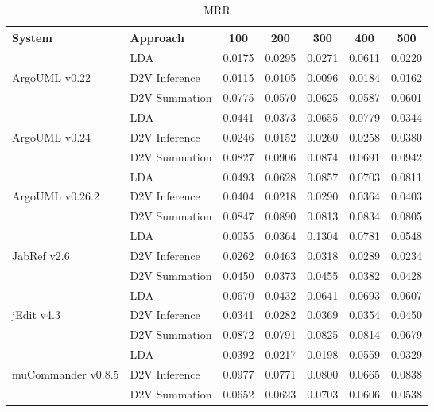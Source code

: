 \begin{table*}
    \centering
\begin{tabular}{llccccc}
\toprule
System & Approach &     100 &    200 &    300 &    400 &    500 \\
\midrule
                   &             LDA & 0.0175 & 0.0295 & 0.0271 & 0.0611 & 0.0220 \\
ArgoUML v0.22      & D2V Inference   & 0.0115 & 0.0105 & 0.0096 & 0.0184 & 0.0162 \\
                   & D2V Summation   & 0.0775 & 0.0570 & 0.0625 & 0.0587 & 0.0601 \\
                     \midrule
                   &             LDA & 0.0441 & 0.0373 & 0.0655 & 0.0779 & 0.0344 \\
ArgoUML v0.24      & D2V Inference   & 0.0246 & 0.0152 & 0.0260 & 0.0258 & 0.0380 \\
                   & D2V Summation   & 0.0827 & 0.0906 & 0.0874 & 0.0691 & 0.0942 \\
                     \midrule
                   &             LDA & 0.0493 & 0.0628 & 0.0857 & 0.0703 & 0.0811 \\
ArgoUML v0.26.2    & D2V Inference   & 0.0404 & 0.0218 & 0.0290 & 0.0364 & 0.0403 \\
                   & D2V Summation   & 0.0847 & 0.0890 & 0.0813 & 0.0834 & 0.0805 \\
                     \midrule
                   &             LDA & 0.0055 & 0.0364 & 0.1304 & 0.0781 & 0.0548 \\
JabRef v2.6        & D2V Inference   & 0.0262 & 0.0463 & 0.0318 & 0.0289 & 0.0234 \\
                   & D2V Summation   & 0.0450 & 0.0373 & 0.0455 & 0.0382 & 0.0428 \\
                     \midrule
                   &             LDA & 0.0670 & 0.0432 & 0.0641 & 0.0693 & 0.0607 \\
jEdit v4.3         & D2V Inference   & 0.0341 & 0.0282 & 0.0369 & 0.0354 & 0.0450 \\
                   & D2V Summation   & 0.0872 & 0.0791 & 0.0825 & 0.0814 & 0.0679 \\
                     \midrule
                   &             LDA & 0.0392 & 0.0217 & 0.0198 & 0.0559 & 0.0329 \\
muCommander v0.8.5 & D2V Inference   & 0.0977 & 0.0771 & 0.0800 & 0.0665 & 0.0838 \\
                   & D2V Summation   & 0.0652 & 0.0623 & 0.0703 & 0.0606 & 0.0538 \\

\bottomrule
\end{tabular}
\caption{MRR}
\label{tab:mrr}
\end{table*}
